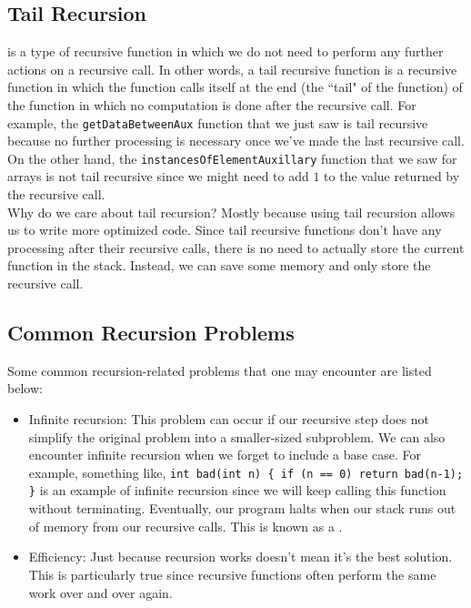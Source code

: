 \subsection{Tail Recursion}

 is a type of recursive function in which we do not need to perform any further actions on a recursive call. In other words, a tail recursive function is a recursive function in which the function calls itself at the end (the ``tail" of the function) of the function in which no computation is done after the recursive call. For example, the \verb!getDataBetweenAux! function that we just saw is tail recursive because no further processing is necessary once we've made the last recursive call. On the other hand, the \verb!instancesOfElementAuxillary! function that we saw for arrays is not tail recursive since we might need to add $1$ to the value returned by the recursive call. \\ 

\noindent Why do we care about tail recursion? Mostly because using tail recursion allows us to write more optimized code.  Since tail recursive functions don't have any processing after their recursive calls, there is no need to actually store the current function in the stack. Instead, we can save some memory and only store the recursive call. \\


\subsection{Common Recursion Problems}

Some common recursion-related problems that one may encounter are listed below:

\begin{itemize}
    \item Infinite recursion: This problem can occur if our recursive step does not simplify the original problem into a smaller-sized subproblem. We can also encounter infinite recursion when we forget to include a base case. For example, something like, \verb!int bad(int n) { if (n == 0) return bad(n-1); }! is an example of infinite recursion since we will keep calling this function without terminating. Eventually, our program halts when our stack runs out of memory from our recursive calls. This is known as a . 
    \item Efficiency: Just because recursion works doesn't mean it's the best solution. This is particularly true since recursive functions often perform the same work over and over again. 
\end{itemize}

